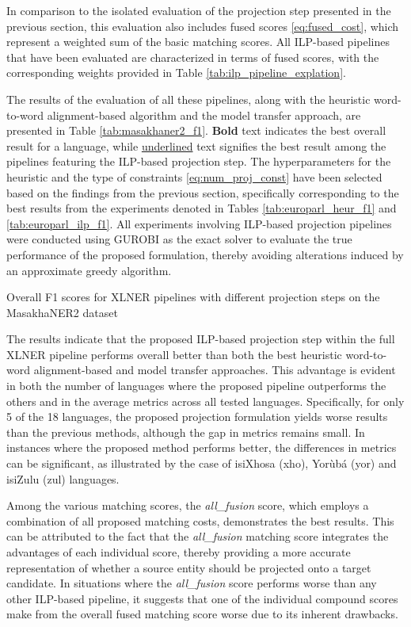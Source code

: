 In comparison to the isolated evaluation of the projection step presented in the
previous section, this evaluation also includes fused scores \eqref{eq:fused_cost},
which represent a weighted sum of the basic matching scores. All ILP-based pipelines
that have been evaluated are characterized in terms of fused scores, with the
corresponding weights provided in Table \ref{tab:ilp_pipeline_explation}.

The results of the evaluation of all these pipelines, along with the heuristic
word-to-word alignment-based algorithm and the model transfer approach, are presented
in Table \ref{tab:masakhaner2_f1}. \textbf{Bold} text indicates the best overall result for a
language, while \underline{underlined} text signifies the best result among the pipelines featuring
the ILP-based projection step. The hyperparameters for the heuristic and the type of
constraints \eqref{eq:num_proj_const} have been selected based on the findings from the
previous section, specifically corresponding to the best results from the experiments
denoted in Tables \ref{tab:europarl_heur_f1} and \ref{tab:europarl_ilp_f1}.
All experiments involving ILP-based projection pipelines were conducted using GUROBI as
the exact solver to evaluate the true performance of the proposed formulation, thereby avoiding
alterations induced by an approximate greedy algorithm.

\begin{table}[ht]
  
  \caption{Overall F1 scores for XLNER pipelines with different projection steps on the
  MasakhaNER2 dataset}
  \label{tab:masakhaner2_f1}
\end{table}

The results indicate that the proposed ILP-based projection step within the full
XLNER pipeline performs overall better than both the best heuristic word-to-word
alignment-based and model transfer approaches. This advantage is evident in both
the number of languages where the proposed pipeline outperforms the others and in
the average metrics across all tested languages. Specifically, for only 5 of the 18
languages, the proposed projection formulation yields worse results than the previous
methods, although the gap in metrics remains small. In instances where the proposed
method performs better, the differences in metrics can be significant, as illustrated
by the case of isiXhosa (xho), Yorùbá (yor) and isiZulu (zul) languages.

Among the various matching scores, the \textit{all\_fusion} score, which employs a
combination of all proposed matching costs, demonstrates the best results. This can
be attributed to the fact that the \textit{all\_fusion} matching score integrates the advantages
of each individual score, thereby providing a more accurate representation of whether
a source entity should be projected onto a target candidate. In situations where the
\textit{all\_fusion} score performs worse than any other ILP-based pipeline, it
suggests that one of the individual compound scores make from the overall
fused matching score worse due to its inherent drawbacks.

